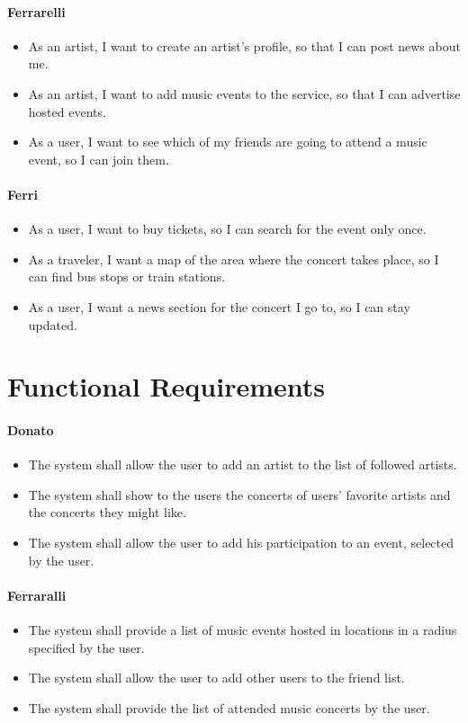\documentclass[11pt,a4paper]{article}
\begin{document}
\paragraph{Ferrarelli}
\begin{itemize}
\item As an artist, I want to create an artist’s profile, so that I can post news about me.
\item As an artist, I want to add music events to the service, so that I can advertise hosted events.
\item As a user, I want to see which of my friends are going to attend a music event, so I can join them.
\end{itemize}
\paragraph{Ferri}
\begin{itemize}
\item As a user, I want to buy tickets, so I can search for the event only once.
\item As a traveler, I want a map of the area where the concert takes place, so I can
find bus stops or train stations. 
\item As a user, I want a news section for the concert I go to, so I can stay updated.
\end{itemize}
\section{Functional Requirements}
\paragraph{Donato}
\begin{itemize}
\item The system shall allow the user to add an artist to the list of followed artists.
\item The system shall show to the users the concerts of users’ favorite artists and the concerts they might like.
\item The system shall allow the user to add his participation to an event, selected by the user.
\end{itemize}
\paragraph{Ferraralli}
\begin{itemize}
\item The system shall provide a list of music events hosted in locations in a radius specified by the user.
\item The system shall allow the user to add other users to the friend list.
\item The system shall provide the list of attended music concerts by the user.
\end{itemize}
\end{document}
